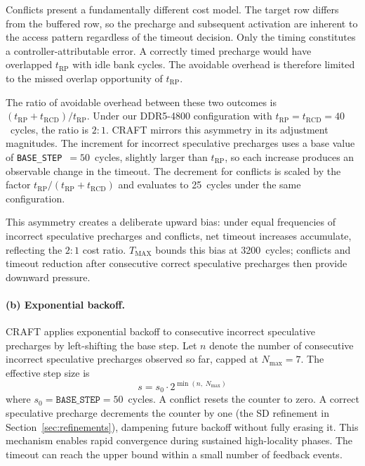 \documentclass[runningheads]{llncs}
\begin{document}
Conflicts present a fundamentally different cost model. The target row differs from the buffered row, so the precharge and subsequent activation are inherent to the access pattern regardless of the timeout decision. Only the timing constitutes a controller-attributable error. A correctly timed precharge would have overlapped $t_\mathrm{RP}$ with idle bank cycles. The avoidable overhead is therefore limited to the missed overlap opportunity of $t_\mathrm{RP}$.

The ratio of avoidable overhead between these two outcomes is $(t_\mathrm{RP} + t_\mathrm{RCD}) / t_\mathrm{RP}$. Under our DDR5-4800 configuration with $t_\mathrm{RP} = t_\mathrm{RCD} = 40$~cycles, the ratio is $2{:}1$. CRAFT mirrors this asymmetry in its adjustment magnitudes. The increment for incorrect speculative precharges uses a base value of \texttt{BASE\_STEP}~$= 50$~cycles, slightly larger than $t_\mathrm{RP}$, so each increase produces an observable change in the timeout. The decrement for conflicts is scaled by the factor $t_\mathrm{RP} / (t_\mathrm{RP} + t_\mathrm{RCD})$ and evaluates to 25~cycles under the same configuration.

This asymmetry creates a deliberate upward bias: under equal frequencies of incorrect speculative precharges and conflicts, net timeout increases accumulate, reflecting the $2{:}1$ cost ratio. $T_\mathrm{MAX}$ bounds this bias at 3200~cycles; conflicts and timeout reduction after consecutive correct speculative precharges then provide downward pressure.

\paragraph{(b) Exponential backoff.}
CRAFT applies exponential backoff to consecutive incorrect speculative precharges by left-shifting the base step. Let $n$ denote the number of consecutive incorrect speculative precharges observed so far, capped at $N_\mathrm{max} = 7$. The effective step size is
\begin{equation}
s = s_0 \cdot 2^{\min(n,\;N_\mathrm{max})}
\end{equation}
where $s_0 = \texttt{BASE\_STEP} = 50$~cycles. A conflict resets the counter to zero. A correct speculative precharge decrements the counter by one (the SD refinement in Section~\ref{sec:refinements}), dampening future backoff without fully erasing it. This mechanism enables rapid convergence during sustained high-locality phases. The timeout can reach the upper bound within a small number of feedback events.
\end{document}
